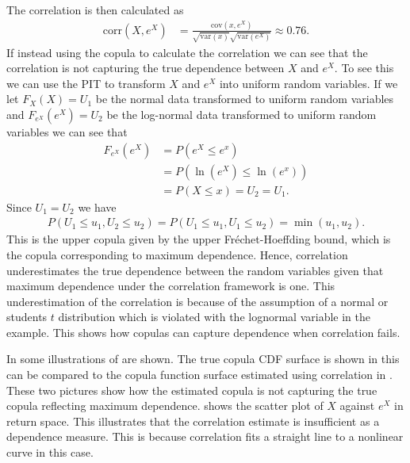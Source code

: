 \begin{example}
    The correlation is then calculated as
    \begin{align*}
        \mathrm{corr}(X,e^X) &= \frac{\mathrm{cov}(x,e^X)}{\sqrt{\mathrm{var}(x)} \sqrt{\mathrm{var}(e^X)}}  \approx 0.76. 
    \end{align*}
    If instead using the copula to calculate the correlation we can see that the correlation is not capturing the true dependence between $X$ and $e^X$. To see this we can use the \gls{PIT} to transform $X$ and $e^X$ into uniform random variables. If we let $F_X(X)=U_1$ be the normal data transformed to uniform random variables and $F_{e^X}(e^X)=U_2$ be the log-normal data transformed to uniform random variables we can see that 
    \begin{align*}
        F_{e^X}(e^X) &= P(e^X \leq e^x)\\
        &= P(\ln(e^X) \leq \ln (e^x))\\
        &=P(X\leq x) = U_2 = U_1.
    \end{align*}
    Since $U_1 = U_2$ we have 
    \begin{align*}
        P(U_1\leq u_1, U_2\leq u_2) = P(U_1\leq u_1, U_1\leq u_2) = \min(u_1,u_2).
    \end{align*}
    This is the upper copula given by the upper Fréchet-Hoeffding bound, which is the copula corresponding to maximum dependence. Hence, correlation underestimates the true dependence between the random variables given that maximum dependence under the correlation framework is one. This underestimation of the correlation is because of the assumption of a normal or students $t$ distribution which is violated with the lognormal variable in the example. This shows how copulas can capture dependence when correlation fails. 

    In  some illustrations of  are shown. The true copula \gls{CDF} surface is shown in  this can be compared to the copula function surface estimated using correlation in . These two pictures show how the estimated copula is not capturing the true copula reflecting maximum dependence. 
     shows the scatter plot of $X$ against $e^X$ in return space. This illustrates that the correlation estimate is insufficient as a dependence measure. This is because correlation fits a straight line to a nonlinear curve in this case. 
    

\end{example}
